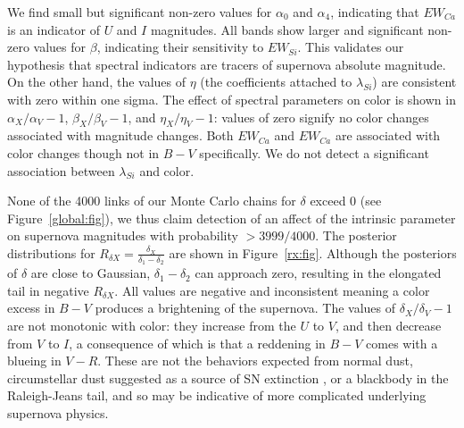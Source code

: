 \documentclass{aastex}   	%
\begin{document}
We find small but significant non-zero values for $\alpha_0$ and $\alpha_4$, indicating that $EW_{Ca}$ is an indicator of $U$ and $I$
magnitudes.  All bands show larger and significant non-zero values for $\beta$, indicating their sensitivity to
$EW_{Si}$.  This validates our hypothesis that spectral indicators
are tracers of supernova absolute magnitude.  On the other hand, the values of $\eta$ (the coefficients attached to $\lambda_{Si}$) are consistent with zero within one sigma.
The effect of spectral parameters on color is shown in $\alpha_X/\alpha_V-1$,  $\beta_X/\beta_V-1$, and  $\eta_X/\eta_V-1$:
values of zero signify no color changes associated with magnitude changes.
Both $EW_{Ca}$ and $EW_{Ca}$ are associated with color changes though not in $B-V$ specifically.
We do not detect a significant association between
$\lambda_{Si}$ and color.

%
%
%

%

None of the 4000 links of
our Monte Carlo chains for $\delta$ exceed 0 (see Figure~\ref{global:fig}), we thus claim detection of an affect of the
intrinsic parameter on supernova magnitudes
with probability $>3999/4000$. 
The posterior distributions for $R_{\delta X}=\frac{\delta_X}{\delta_1-\delta_2}$ are shown in Figure~\ref{rx:fig}.
Although the posteriors of $\delta$ are close to Gaussian, $\delta_1-\delta_2$ can approach zero, resulting in the
elongated tail in negative  $R_{\delta X}$.
All values are negative and inconsistent meaning a color excess in $B-V$ produces a brightening of the supernova.
The values of $\delta_X/\delta_V-1$ are not monotonic with color: they increase from the $U$ to $V$, and then decrease
from $V$ to $I$,
a consequence
of which is that
a reddening in $B-V$ comes with a blueing in $V-R$.
These are not the behaviors expected from normal dust,
circumstellar dust suggested as a source of SN extinction \citep{2005ApJ...635L..33W,2008ApJ...686L.103G,
2015ApJ...807L..26G}, or a blackbody in the Raleigh-Jeans tail, and so may be indicative of
more complicated underlying supernova physics.
\end{document}

